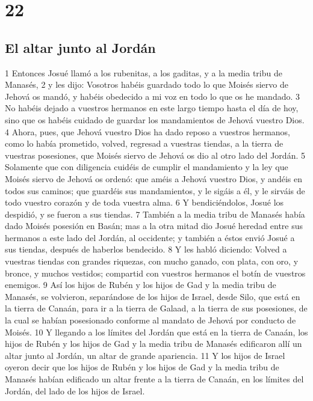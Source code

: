 \chapter{22}

\section*{El altar junto al Jordán}


1 Entonces Josué llamó a los rubenitas, a los gaditas, y a la media tribu de Manasés,
2 y les dijo: Vosotros habéis guardado todo lo que Moisés siervo de Jehová os mandó, y habéis obedecido a mi voz en todo lo que os he mandado. 
3 No habéis dejado a vuestros hermanos en este largo tiempo hasta el día de hoy, sino que os habéis cuidado de guardar los mandamientos de Jehová vuestro Dios.
4 Ahora, pues, que Jehová vuestro Dios ha dado reposo a vuestros hermanos, como lo había prometido, volved, regresad a vuestras tiendas, a la tierra de vuestras posesiones, que Moisés siervo de Jehová os dio al otro lado del Jordán.
5 Solamente que con diligencia cuidéis de cumplir el mandamiento y la ley que Moisés siervo de Jehová os ordenó: que améis a Jehová vuestro Dios, y andéis en todos sus caminos; que guardéis sus mandamientos, y le sigáis a él, y le sirváis de todo vuestro corazón y de toda vuestra alma.
6 Y bendiciéndolos, Josué los despidió, y se fueron a sus tiendas.
7 También a la media tribu de Manasés había dado Moisés posesión en Basán; mas a la otra mitad dio Josué heredad entre sus hermanos a este lado del Jordán, al occidente; y también a éstos envió Josué a sus tiendas, después de haberlos bendecido.
8 Y les habló diciendo: Volved a vuestras tiendas con grandes riquezas, con mucho ganado, con plata, con oro, y bronce, y muchos vestidos; compartid con vuestros hermanos el botín de vuestros enemigos.
9 Así los hijos de Rubén y los hijos de Gad y la media tribu de Manasés, se volvieron, separándose de los hijos de Israel, desde Silo, que está en la tierra de Canaán, para ir a la tierra de Galaad, a la tierra de sus posesiones, de la cual se habían posesionado conforme al mandato de Jehová por conducto de Moisés.
10 Y llegando a los límites del Jordán que está en la tierra de Canaán, los hijos de Rubén y los hijos de Gad y la media tribu de Manasés edificaron allí un altar junto al Jordán, un altar de grande apariencia.
11 Y los hijos de Israel oyeron decir que los hijos de Rubén y los hijos de Gad y la media tribu de Manasés habían edificado un altar frente a la tierra de Canaán, en los límites del Jordán, del lado de los hijos de Israel.
